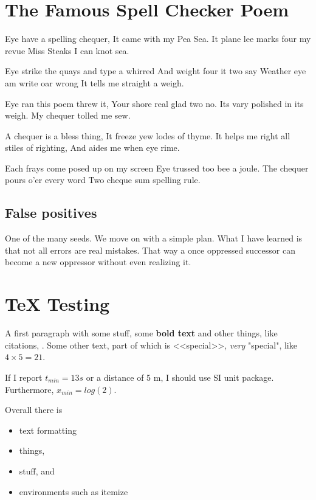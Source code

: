 \documentclass{scrartcl}
\begin{document}



\section{The Famous Spell Checker Poem}
Eye have a spelling chequer,
It came with my Pea Sea.
It plane lee marks four my revue
Miss Steaks I can knot sea.

Eye strike the quays and type a whirred
And weight four it two say
Weather eye am write oar wrong
It tells me straight a weigh.

Eye ran this poem threw it,
Your shore real glad two no.
Its vary polished in its weigh.
My chequer tolled me sew.

A chequer is a bless thing,
It freeze yew lodes of thyme.
It helps me right all stiles of righting,
And aides me when eye rime.

Each frays come posed up on my screen
Eye trussed too bee a joule.
The chequer pours o'er every word
Two cheque sum spelling rule.



\subsection{False positives}
One of the many seeds. We move on with a simple plan.
What I have learned is that not all errors are real mistakes.
That way a once oppressed successor can become a new oppressor without even realizing it.





\section{TeX Testing}\label{sec:texsection}
A first paragraph with some stuff, some \textbf{bold text}   and other things, like citations\cite{my:paper}, \cite{other1}.
Some other text, part of which is <<special>>, \emph{very} "special", like $4 \times 5 = 21$.

If I report $t_{min} = 13s$ or a distance of 5 m, I should use SI unit package.
Furthermore, $x_{min} = log(2)$.


Overall there is 
\begin{itemize}
    \item text formatting
    \item things,
    \item stuff, and
    \item environments such as itemize
\end{itemize}
\end{document}
